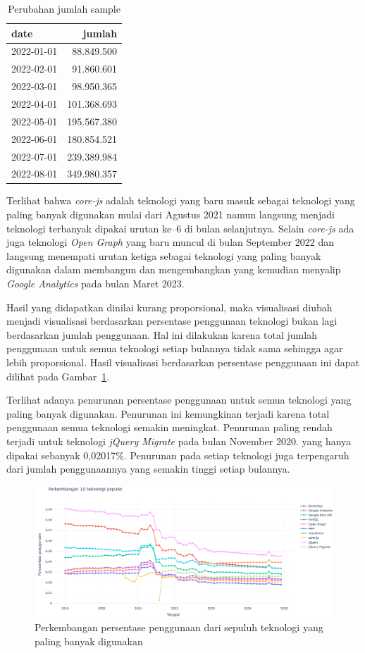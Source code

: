 \begin{table}[H]
\centering
\caption{Perubahan jumlah sample}
\label{tab:lonjakan}
\begin{tabular}{|l|r|}
\hline
date & jumlah \\ \hline
2022-01-01 & 88.849.500 \\ \hline
2022-02-01 & 91.860.601 \\ \hline
2022-03-01 & 98.950.365 \\ \hline
2022-04-01 & 101.368.693 \\ \hline
2022-05-01 & 195.567.380 \\ \hline
2022-06-01 & 180.854.521 \\ \hline
2022-07-01 & 239.389.984 \\ \hline
2022-08-01 & 349.980.357 \\ \hline
\end{tabular}
\end{table}

Terlihat bahwa \textit{core-js} adalah teknologi yang baru masuk sebagai teknologi yang paling banyak digunakan mulai dari Agustus 2021 namun langsung menjadi teknologi terbanyak dipakai urutan ke--6 di bulan selanjutnya. Selain \textit{core-js} ada juga teknologi \textit{Open Graph} yang baru muncul di bulan September 2022 dan langsung menempati urutan ketiga sebagai teknologi yang paling banyak digunakan dalam membangun dan mengembangkan \web yang kemudian menyalip \textit{Google Analytics} pada bulan Maret 2023.

Hasil yang didapatkan dinilai kurang proporsional, maka visualisasi diubah menjadi visualisasi berdasarkan persentase penggunaan teknologi bukan lagi berdasarkan jumlah penggunaan. Hal ini dilakukan karena total jumlah penggunaan untuk semua teknologi setiap bulannya tidak sama sehingga agar lebih proporsional. Hasil visualisasi berdasarkan persentase penggunaan ini dapat dilihat pada Gambar~\ref{fig:persentasereal}.

Terlihat adanya penurunan persentase penggunaan untuk semua teknologi yang paling banyak digunakan. Penurunan ini kemungkinan terjadi karena total penggunaan semua teknologi semakin meningkat. Penurunan paling rendah terjadi untuk teknologi \textit{jQuery Migrate} pada bulan November 2020. yang hanya dipakai sebanyak 0,02017\%. Penurunan pada setiap teknologi juga terpengaruh dari jumlah penggunaannya yang semakin tinggi setiap bulannya.  

\begin{figure}[H]
    \centering
    \includegraphics[width=0.7\linewidth]{Gambar/Perkembangan persentase penggunaan real.png}
    \caption{Perkembangan persentase penggunaan dari sepuluh teknologi yang paling banyak digunakan}
    \label{fig:persentasereal}
\end{figure}

